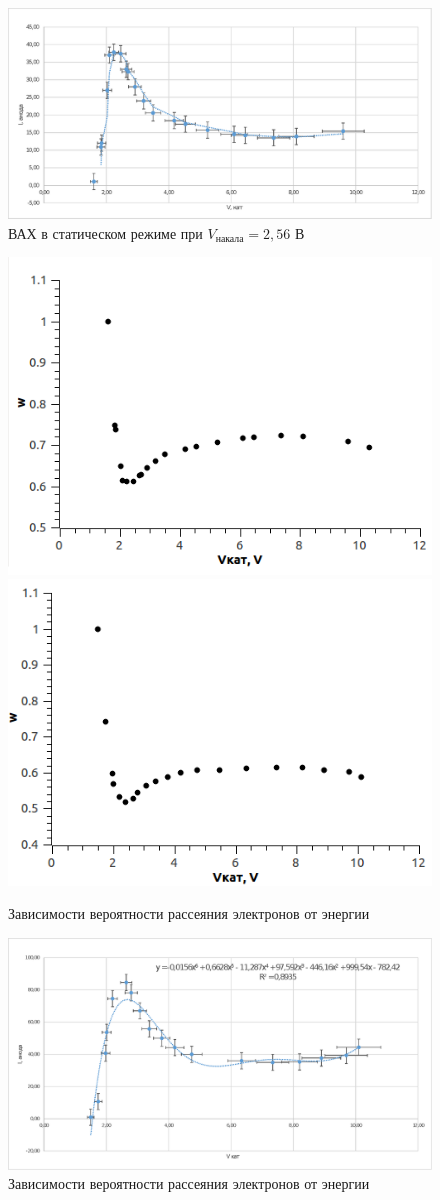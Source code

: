 \documentclass[a4paper,12pt]{article}
\theoremstyle{plain} %
\theoremstyle{definition} %
\theoremstyle{remark} %
\begin{document}
\begin{figure}[h]
    \begin{center}
        \includegraphics[width=1 \textwidth]{graph2.eps}
    \end{center}
    \caption{ВАХ в статическом режиме при $V_\text{накала} = 2,56 \text{ В}$}
\end{figure}

\begin{figure}[h]
    \begin{floatrow}
        \includegraphics[width=0.5 \textwidth]{lol2.png}
        \includegraphics[width=0.5 \textwidth]{lol.png}
    \end{floatrow}
    \caption{Зависимости вероятности рассеяния электронов от энергии}
\end{figure}

\newpage

\begin{figure}[h]
    \begin{floatrow}
        \includegraphics[width=\textwidth]{book1.eps}
    \end{floatrow}
    \caption{Зависимости вероятности рассеяния электронов от энергии}
\end{figure}
\end{document}
